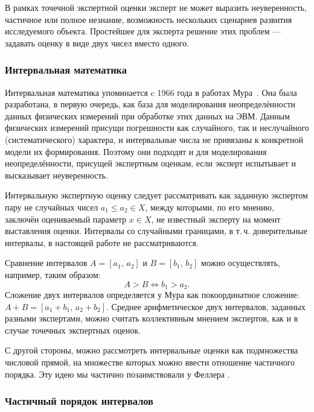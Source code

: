 В рамках точечной экспертной оценки эксперт не может выразить неуверенность, частичное или полное незнание, возможность нескольких сценариев развития исследуемого объекта. Простейшее для эксперта решение этих проблем --- задавать оценку в виде двух чисел вместо одного.

\subsubsection{Интервальная математика}

Интервальная математика упоминается c 1966 года в работах Мура~\cite{moore1966interval, moore2009introduction}. Она была разработана, в первую очередь, как база для моделирования неопределённости данных физических измерений при обработке этих данных на ЭВМ. Данным физических измерений присущи погрешности как случайного, так и неслучайного (систематического) характера, и интервальные числа не привязаны к конкретной модели их формирования. Поэтому они подходят и для моделирования неопределённости, присущей экспертным оценкам, если эксперт испытывает и высказывает неуверенность. 

Интервальную экспертную оценку следует рассматривать как заданную экспертом пару не случайных чисел $a_1 \leq a_2 \in X$, между которыми, по его мнению, заключён оцениваемый параметр $x \in X$, не известный эксперту на момент выставления оценки.  Интервалы со случайными границами, в т.\,ч. доверительные интервалы, в настоящей работе не рассматриваются.

Сравнение интервалов $A = [a_1,\,a_2]$ и $B = [b_1,\,b_2]$ можно осуществлять, например, таким образом:
\begin{equation*}
    A > B \Leftrightarrow b_1 > a_2. 
\end{equation*}
Сложение двух интервалов  определяется у Мура как покоординатное сложение: $A + B = [a_1+b_1,\,a_2+b_2]$. Среднее арифметическое двух интервалов, заданных разными экспертами, можно считать коллективным мнением экспертов, как и в случае точечных экспертных оценок.

С другой стороны, можно рассмотреть интервальные оценки как подмножества числовой прямой, на множестве которых можно ввести отношение частичного порядка. Эту идею мы частично позаимствовали у Феллера \cite{cit:feller}.

\subsubsection{Частичный порядок интервалов}
\label{order_int}


